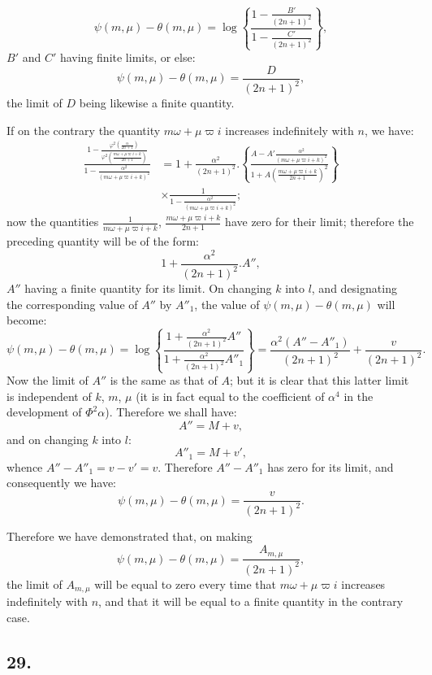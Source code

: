 \documentclass{article}
\begin{document}
\[ \psi(m,\mu)-\theta(m,\mu)=\log\left\{\frac{1-\frac{B'}{(2n+1)^{2}}}{1-\frac{C'}{(2n+1)^{2}}}\right\}, \]
$B'$ and $C'$ having finite limits, or else:
\[ \psi(m,\mu)-\theta(m,\mu)=\frac{D}{(2n+1)^{2}}, \]
the limit of $D$ being likewise a finite quantity.

If on the contrary the quantity $m\omega+\mu\varpi i$ increases indefinitely with $n$, we have:
\[ \begin{aligned}\frac{1-\frac{\varphi^{2}\left(\frac{\alpha}{2n+1}\right)}{\varphi^{2}\left(\frac{m\omega+\mu\varpi i+k}{2n+1}\right)}}{1-\frac{\alpha^{2}}{(m\omega+\mu\varpi i+k)^{2}}}&=1+\frac{\alpha^{2}}{(2n+1)^{2}}.\left\{\frac{A-A'\frac{\alpha^{2}}{(m\omega+\mu\varpi i+k)^{2}}}{1+A\left(\frac{m\omega+\mu\varpi i+k}{2n+1}\right)^{2}}\right\}\\ &\times\frac{1}{1-\frac{\alpha^{2}}{(m\omega+\mu\varpi i+k)^{2}}};\end{aligned} \]
now the quantities $\frac{1}{m\omega+\mu\varpi i+k}$, $\frac{m\omega+\mu\varpi i+k}{2n+1}$ have zero for their limit; therefore the preceding quantity will be of the form:
\[ 1+\frac{\alpha^{2}}{(2n+1)^{2}}.A'', \]
$A''$ having a finite quantity for its limit. On changing $k$ into $l$, and designating the corresponding value of $A''$ by $A''_{1}$, the value of $\psi(m,\mu)-\theta(m,\mu)$ will become:
\[ \psi(m,\mu)-\theta(m,\mu)=\log\left\{\frac{1+\frac{\alpha^{2}}{(2n+1)^{2}}A''}{1+\frac{\alpha^{2}}{(2n+1)^{2}}A''_{1}}\right\}=\frac{\alpha^{2}(A''-A''_{1})}{(2n+1)^{2}}+\frac{v}{(2n+1)^{2}}. \]
Now the limit of $A''$ is the same as that of $A$; but it is clear that this latter limit is independent of $k$, $m$, $\mu$ (it is in fact equal to the coefficient of $\alpha^{4}$ in the development of $\Phi^{2}\alpha$). Therefore we shall have:
\[ A''=M+v, \]
and on changing $k$ into $l$:
\[ A''_{1}=M+v', \]
whence $A''-A''_{1}=v-v'=v$. Therefore $A''-A''_{1}$ has zero for its limit, and consequently we have:
\[ \psi(m,\mu)-\theta(m,\mu)=\frac{v}{(2n+1)^{2}}. \]


Therefore we have demonstrated that, on making
\[ \psi(m,\mu)-\theta(m,\mu)=\frac{A_{m,\mu}}{(2n+1)^{2}}, \tag{167.} \]
the limit of $A_{m,\mu}$ will be equal to zero every time that $m\omega+\mu\varpi i$ increases indefinitely with $n$, and that it will be equal to a finite quantity in the contrary case.

\subsection*{29.}
\end{document}
